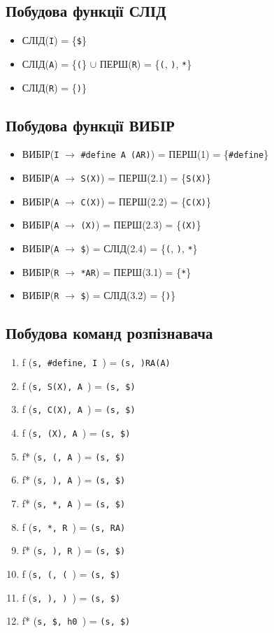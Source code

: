 \subsection{Побудова функції СЛІД}
\begin{itemize}
    \item  СЛІД(\verb|I|) = \{\verb|$|\}
    \item  СЛІД(\verb|A|) = \{\verb|(|\} $\cup$ ПЕРШ(\verb|R|) = \{\verb|(|, \verb|)|, \verb|*|\}
    \item  СЛІД(\verb|R|) = \{\verb|)|\}

\end{itemize}

\subsection{Побудова функції ВИБІР}
\begin{itemize}
    \item  ВИБІР(\verb|I| $\to$ \verb|#define A (AR)|) = ПЕРШ(1) = \{\verb|#define|\}
    \item  ВИБІР(\verb|A| $\to$ \verb|S(X)|) = ПЕРШ(2.1) = \{\verb|S(X)|\}
    \item  ВИБІР(\verb|A| $\to$ \verb|C(X)|) = ПЕРШ(2.2) = \{\verb|C(X)|\}
    \item  ВИБІР(\verb|A| $\to$ \verb|(X)|) = ПЕРШ(2.3) = \{\verb|(X)|\}
    \item  ВИБІР(\verb|A| $\to$ \verb|$|) = СЛІД(2.4) = \{\verb|(|, \verb|)|, \verb|*|\}
    \item  ВИБІР(\verb|R| $\to$ \verb|*AR|) = ПЕРШ(3.1) = \{\verb|*|\}
    \item  ВИБІР(\verb|R| $\to$ \verb|$|) = СЛІД(3.2) = \{\verb|)|\}
\end{itemize}


\newpage
\subsection{Побудова команд розпізнавача}
\begin{enumerate}
    \item  f (\verb|s, #define, I |) = \verb|(s, )RA(A)|\
    \item  f (\verb|s, S(X), A |) = \verb|(s, $)|\
    \item  f (\verb|s, C(X), A |) = \verb|(s, $)|\
    \item  f (\verb|s, (X), A |) = \verb|(s, $)|\
    \item  f* (\verb|s, (, A |) = \verb|(s, $)|\
    \item  f* (\verb|s, ), A |) = \verb|(s, $)|\
    \item  f* (\verb|s, *, A |) = \verb|(s, $)|\
    \item  f (\verb|s, *, R |) = \verb|(s, RA)|\
    \item  f* (\verb|s, ), R |) = \verb|(s, $)|\
    \item  f (\verb|s, (, ( |) = \verb|(s, $)|\
    \item  f (\verb|s, ), ) |) = \verb|(s, $)|\
    \item  f* (\verb|s, $, h0 |) = \verb|(s, $)|\

\end{enumerate}

